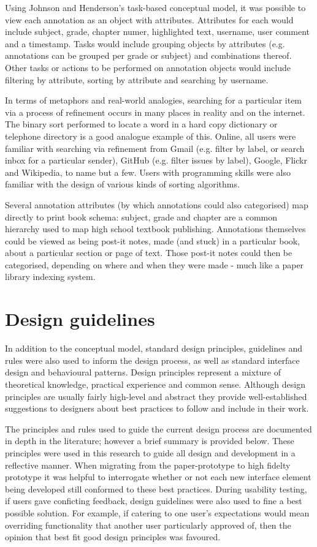 Using Johnson and Henderson's task-based conceptual model\citep[p. 30]{Johnson}, it was possible to view each annotation as an object with attributes. Attributes for each would include subject, grade, chapter numer, highlighted text, username, user comment and a timestamp. Tasks would include grouping objects by attributes (e.g. annotations can be grouped per grade or subject) and combinations thereof. Other tasks or actions to be performed on annotation objects would include filtering by attribute, sorting by attribute and searching by username. 

In terms of metaphors and real-world analogies, searching for a particular item via a process of refinement occurs in many places in reality and on the internet. The binary sort performed to locate a word in a hard copy dictionary or telephone directory is a good analogue example of this. Online, all users were familiar with searching via refinement from Gmail (e.g. filter by label, or search inbox for a particular sender), GitHub (e.g. filter issues by label), Google, Flickr and Wikipedia, to name but a few. Users with programming skills were also familiar with the design of various kinds of sorting algorithms. 

Several annotation attributes (by which annotations could also categorised) map directly to print book schema: subject, grade and chapter are a common hierarchy used to map high school textbook publishing. Annotations themselves could be viewed as being post-it notes, made (and stuck) in a particular book, about a particular section or page of text. Those post-it notes could then be categorised, depending on where and when they were made - much like a paper library indexing system. 

\section{Design guidelines}
In addition to the conceptual model, standard design principles, guidelines and rules were also used to inform the design process, as well as standard interface design and behavioural patterns. Design principles represent a mixture of theoretical knowledge, practical experience and common sense\citep[p. 26]{RogersPreece}. Although design principles are usually fairly high-level and abstract they provide well-established suggestions to designers about best practices to follow and include in their work. 

The principles and rules used to guide the current design process are documented in depth in the literature; however a brief summary is provided below. These principles were used in this research to guide all design and development in a reflective manner. When migrating from the paper-prototype to high fidelty prototype it was helpful to interrogate whether or not each new interface element being developed still conformed to these best practices. During usability testing, if users gave conficting feedback, design guidelines were also used to fine a best possible solution. For example, if catering to one user's expectations would mean overriding functionality that another user particularly approved of, then the opinion that best fit good design principles was favoured. 

